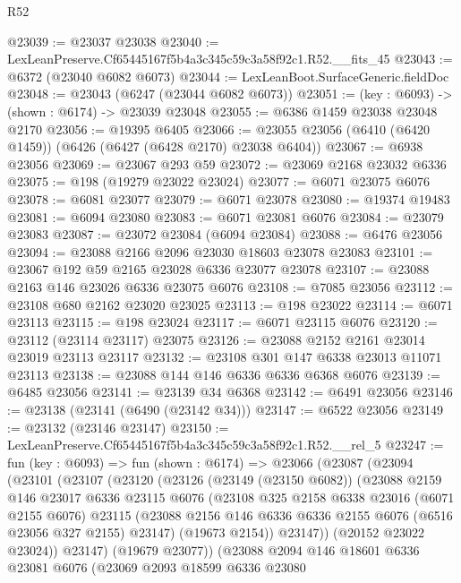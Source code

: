 \begin{lexlean}{R52}
\begin{coremodule}
@23039 := @23037 @23038
@23040 := LexLeanPreserve.Cf65445167f5b4a3c345c59c3a58f92c1.R52.__fits_45
@23043 := @6372 (@23040 @6082 @6073)
@23044 := LexLeanBoot.SurfaceGeneric.fieldDoc
@23048 := @23043 (@6247 (@23044 @6082 @6073))
@23051 := (key : @6093) -> (shown : @6174) -> @23039 @23048
@23055 := @6386 @1459 @23038 @23048 @2170
@23056 := @19395 @6405
@23066 := @23055 @23056 (@6410 (@6420 @1459)) (@6426 (@6427 (@6428 @2170) @23038 @6404))
@23067 := @6938 @23056
@23069 := @23067 @293 @59
@23072 := @23069 @2168 @23032 @6336
@23075 := @198 (@19279 @23022 @23024)
@23077 := @6071 @23075 @6076
@23078 := @6081 @23077
@23079 := @6071 @23078
@23080 := @19374 @19483
@23081 := @6094 @23080
@23083 := @6071 @23081 @6076
@23084 := @23079 @23083
@23087 := @23072 @23084 (@6094 @23084)
@23088 := @6476 @23056
@23094 := @23088 @2166 @2096 @23030 @18603 @23078 @23083
@23101 := @23067 @192 @59 @2165 @23028 @6336 @23077 @23078
@23107 := @23088 @2163 @146 @23026 @6336 @23075 @6076
@23108 := @7085 @23056
@23112 := @23108 @680 @2162 @23020 @23025
@23113 := @198 @23022
@23114 := @6071 @23113
@23115 := @198 @23024
@23117 := @6071 @23115 @6076
@23120 := @23112 (@23114 @23117) @23075
@23126 := @23088 @2152 @2161 @23014 @23019 @23113 @23117
@23132 := @23108 @301 @147 @6338 @23013 @11071 @23113
@23138 := @23088 @144 @146 @6336 @6336 @6368 @6076
@23139 := @6485 @23056
@23141 := @23139 @34 @6368
@23142 := @6491 @23056
@23146 := @23138 (@23141 (@6490 (@23142 @34)))
@23147 := @6522 @23056
@23149 := @23132 (@23146 @23147)
@23150 := LexLeanPreserve.Cf65445167f5b4a3c345c59c3a58f92c1.R52.__rel_5
@23247 := fun (key : @6093) =>
  fun (shown : @6174) =>
  @23066
    (@23087
      (@23094
        (@23101
          (@23107
            (@23120
              (@23126
                (@23149 (@23150 @6082))
                (@23088
                  @2159
                  @146
                  @23017
                  @6336
                  @23115
                  @6076
                  (@23108
                    @325
                    @2158
                    @6338
                    @23016
                    (@6071 @2155 @6076)
                    @23115
                    (@23088 @2156 @146 @6336 @6336 @2155 @6076 (@6516 @23056 @327 @2155) @23147)
                    (@19673 @2154))
                  @23147))
              (@20152 @23022 @23024))
            @23147)
          (@19679 @23077))
        (@23088
          @2094
          @146
          @18601
          @6336
          @23081
          @6076
          (@23069
            @2093
            @18599
            @6336
            @23080

\end{coremodule}
\end{lexlean}
